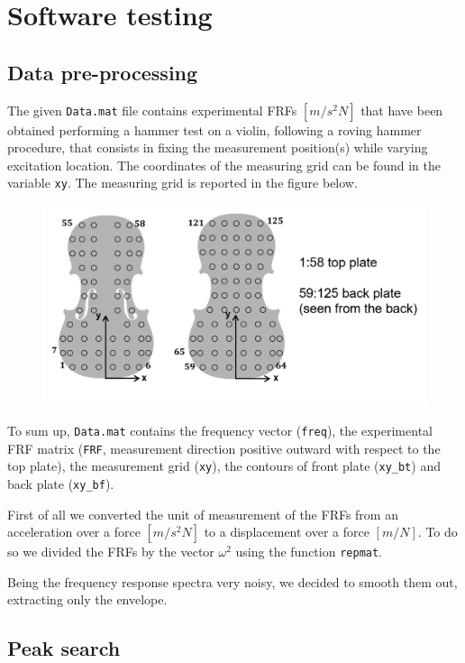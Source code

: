 \documentclass[a4paper,12pt,oneside]{article}
\begin{document}
\section{Software testing}

\subsection{Data pre-processing}

The given \lstinline!Data.mat! file contains experimental FRFs $ [m / s^2 N] $ that have been obtained performing a hammer test on a violin, following a roving hammer procedure, that consists in fixing the measurement position(s) while varying excitation location.
The coordinates of the measuring grid can be found in the variable \lstinline!xy!. The measuring grid is reported in the figure below.

\begin{figure}[H]
	\centering
	\includegraphics[scale=0.4]{grid_slides}
\end{figure}

To sum up, \lstinline!Data.mat! contains the frequency vector (\lstinline!freq!), the experimental FRF matrix (\lstinline!FRF!, measurement direction positive outward with respect to the top plate), the measurement grid (\lstinline!xy!), the contours of front plate (\lstinline!xy_bt!) and back plate (\lstinline!xy_bf!).

First of all we converted the unit of measurement of the FRFs from an acceleration over a force $ [m / s^2 N] $ to a displacement over a force $ [m / N] $. To do so we divided the FRFs by the vector $ \omega^2 $ using the function \lstinline!repmat!.

Being the frequency response spectra very noisy, we decided to smooth them out, extracting only the envelope.

\subsection{Peak search}
\label{peak_search} 
\end{document}
